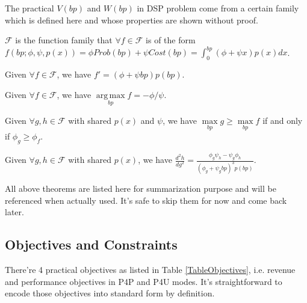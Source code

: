 \documentclass[sigconf]{acmart}
\DeclareMathOperator*{\argmax}{arg\,max}
\newcommand{\pprob}{\phi}
\newcommand{\pcost}{\psi}
\newcommand{\uff}{\mathscr{F}}
\newcommand{\uf}{f(bp; \pprob, \pcost, p(x))}
\begin{document}
The practical $V(bp)$ and $W(bp)$ in DSP problem come from a certain family
    which is defined here and whose properties are shown without proof.

\begin{definition}
$\uff$ is the function family that $\forall f \in \uff$ is of the form
    $ \uf = \pprob Prob(bp) + \pcost Cost(bp) = \int_0^{bp} (\pprob + \pcost x)p(x)dx $.
\end{definition}

\begin{theorem} \label{DerivationTheorem}
Given $\forall f \in \uff$, we have $f'=(\pprob + \pcost{}bp)p(bp)$.
\end{theorem}

\begin{theorem} \label{ArgMaxTheorem}
Given $\forall f \in \uff$, we have $\argmax\limits_{bp} f = - \pprob / \pcost$.
\end{theorem}

\begin{theorem} \label{ComparisonTheorem}
Given $\forall g,h \in \uff$ with shared $p(x)$ and $\pcost$, we have $\max\limits_{bp} g \ge \max\limits_{bp} f$
    if and only if $\pprob_g \ge \pprob_f$.
\end{theorem}

\begin{theorem} \label{SecondDerivationTheorem}
Given $\forall g,h \in \uff$ with shared $p(x)$,
    we have $\frac{d^2h}{dg^2} = \frac{\pprob_g \pcost_h - \pcost_g \pprob_h}{(\pprob_g + \pcost_g bp)^3 p(bp)}$.
\end{theorem}

All above theorems are listed here for summarization purpose and will be referenced when actually used.
It's safe to skip them for now and come back later.

\subsection{Objectives and Constraints} \label{ObjectivesAndConstraints}

There're 4 practical objectives as listed in Table \ref{TableObjectives},
    i.e. revenue and performance objectives in P4P and P4U modes.
It's straightforward to encode those objectives into standard form by definition.
\end{document}
